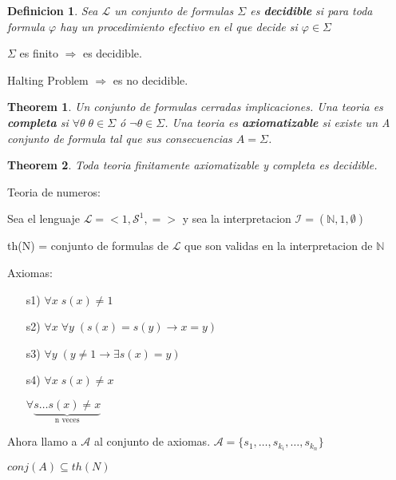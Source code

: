 \documentclass{amsart}
\newtheorem*{teorema}{Theorem}
\newtheorem*{definicion}{Definicion}
\begin{document}
\begin{definicion}
Sea $\mathcal{L}$ un conjunto de formulas $\Sigma$ es \textbf{decidible} si para toda formula $\varphi$ hay un procedimiento efectivo en el que decide si $\varphi \in \Sigma$
\end{definicion}

\begin{ejercicio}
$\Sigma$ es finito $\Rightarrow$ es decidible.

Halting Problem $\Rightarrow$ es no decidible.
\end{ejercicio}

\begin{teorema}
Un conjunto de formulas cerradas implicaciones. Una teoria es \textbf{completa} si $\forall \theta \; \theta \in \Sigma$ \'o $\neg \theta \in \Sigma$. Una teoria es \textbf{axiomatizable} si existe un A conjunto de formula tal que sus consecuencias $A = \Sigma$.
\end{teorema}

\begin{teorema}
Toda teoria finitamente axiomatizable y completa es decidible.
\end{teorema}

\begin{ejercicio}
Teoria de numeros:

Sea el lenguaje $\mathcal{L} = <1, \mathcal{S}^1, = >$ y sea la interpretacion $\mathcal{I} = (\mathbb{N}, 1, \emptyset)$

th(N) = conjunto de formulas de $\mathcal{L}$ que son validas en la interpretacion de $\mathbb{N}$

Axiomas:

\begin{enumerate}
	\item[s1)] $\forall x \; s(x) \neq 1$
	\item[s2)] $\forall x \; \forall y \; (s(x) = s(y) \rightarrow x = y)$
	\item[s3)] $\forall y \; (y \neq 1 \rightarrow \exists s(x) = y)$
	\item[s4)] $\forall x \; s(x) \neq x$
	
	$\forall \underbrace{s \ldots s(x) \neq x}_{\text{n veces}}$
\end{enumerate}


Ahora llamo a $\mathcal{A}$ al conjunto de axiomas. $\mathcal{A} = \{s_1, \ldots, s_{k_i}, \ldots, s_{k_n}\}$


$conj(A) \subseteq th(N)$


\end{ejercicio}
\end{document}
